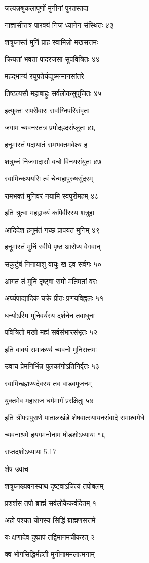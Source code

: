 जल्पन्नश्रुकलापूर्णो मुनीनां पुरतस्तदा

नाज्ञासीत्तत्र पारक्यं निजं ध्यानेन संस्थितः ४३

शत्रुघ्नस्तं मुनिं प्राह स्वामिन्नो मखसत्तमः

क्रियतां भवता पादरजसा सुपवित्रितः ४४

महद्भाग्यं रघुपतेर्यद्युष्मन्मानसांतरे

तिष्ठत्यसौ महाबाहुः सर्वलोकसुपूजितः ४५

इत्युक्तः सपरीवारः सर्वाग्निपरिसंवृतः

जगाम च्यवनस्तत्र प्रमोदह्रदसंप्लुतः ४६

हनूमांस्तं पदायांतं रामभक्तमवेक्ष्य ह

शत्रुघ्नं निजगादासौ वचो विनयसंयुतः ४७

स्वामिन्कथयसि त्वं चेन्महापुरुषसुंदरम्

रामभक्तं मुनिवरं नयामि स्वपुरीमहम् ४८

इति श्रुत्वा महद्वाक्यं कपिवीरस्य शत्रुहा

आदिदेश हनूमंतं गच्छ प्रापयतं मुनिम् ४९

हनूमांस्तं मुनिं स्वीये पृष्ठ आरोप्य वेगवान्

सकुटुंबं निनायाशु वायुः ख इव सर्वगः ५०

आगतं तं मुनिं दृष्ट्वा रामो मतिमतां वरः

अर्घ्यपाद्यादिकं चक्रे प्रीतः प्रणयविह्वलः ५१

धन्योऽस्मि मुनिवर्यस्य दर्शनेन तवाधुना

पवित्रितो मखो मह्यं सर्वसंभारसंभृतः ५२

इति वाक्यं समाकर्ण्य च्यवनो मुनिसत्तमः

उवाच प्रेमनिर्भिन्न पुलकांगोऽतिनिर्वृतः ५३

स्वामिन्ब्रह्मण्यदेवस्य तव वाडवपूजनम्

युक्तमेव महाराज धर्ममार्गं प्ररक्षितुः ५४

इति श्रीपद्मपुराणे पातालखंडे शेषवात्स्यायनसंवादे रामाश्वमेधे

च्यवनाश्रमे हयगमनोनाम षोडशोऽध्यायः १६

सप्तदशोऽध्यायः 5.17

शेष उवाच

शत्रुघ्नश्च्यवनस्याथ दृष्ट्वाऽचिंत्यं तपोबलम्

प्रशशंस तपो ब्राह्मं सर्वलोकैकवंदितम् १

अहो पश्यत योगस्य सिद्धिं ब्राह्मणसत्तमे

यः क्षणादेव दुष्प्रापं तद्विमानमचीकरत् २

क्व भोगसिद्धिर्महती मुनीनाममलात्मनाम्


